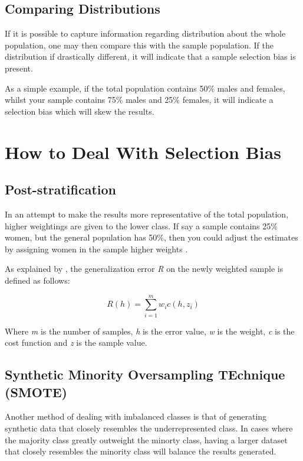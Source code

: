 	\subsection{Comparing Distributions}
	
	If it is possible to capture information regarding distribution about the whole population, one may then compare this with the sample population. If the distribution if drastically different, it will indicate that a sample selection bias is present.

As a simple example, if the total population contains 50\% males and females, whilst your sample contains 75\% males and 25\% females, it will indicate a selection bias which will skew the results.

	\section{How to Deal With Selection Bias}
	
	\subsection{Post-stratification}
	
	In an attempt to make the results more representative of the total population, higher weightings are given to the lower class. If say a sample contains 25\% women, but the general population has 50\%, then you could adjust the estimates by assigning women in the sample higher weights \citep{HoltSmith1979}.
	
As explained by \citet{CortesEtAl2008}, the generalization error \textit{R} on the newly weighted sample is defined as follows:
	
	\begin{equation}\label{weighted_error_function}
    R(h) = \sum_{i=1}^m w_ic(h,z_i)
	\end{equation}
	
	Where \textit{m} is the number of samples, \textit{h} is the error value, \textit{w} is the weight, \textit{c} is the cost function and \textit{z} is the sample value.
	
	\subsection{Synthetic Minority Oversampling TEchnique (SMOTE)}
	
	Another method of dealing with imbalanced classes is that of generating synthetic data that closely resembles the underrepresented class. In cases where the majority class greatly outweight the minorty class, having a larger dataset that closely resembles the minority class will balance the results generated.
	
